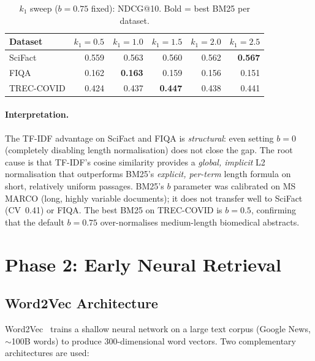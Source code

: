 \documentclass[12pt, a4paper]{article}
\makeatletter
\newcommand{\ndcg}{NDCG@10}
\newcommand{\tc}{TREC-COVID}
\newcommand{\fiqa}{FIQA}
\newcommand{\scifact}{SciFact}
\makeatother
\begin{document}
\begin{table}[h]
\centering
\caption{$k_1$ sweep ($b=0.75$ fixed): \ndcg{}.  Bold = best BM25 per dataset.}
\label{tab:bm25_k1_sweep}
\begin{tabular}{lrrrrr}
\toprule
\textbf{Dataset} & $k_1=0.5$ & $k_1=1.0$ & $k_1=1.5$ & $k_1=2.0$ & $k_1=2.5$ \\
\midrule
\scifact{}  & 0.559 & 0.563 & 0.560 & 0.562 & \textbf{0.567} \\
\fiqa{}     & 0.162 & \textbf{0.163} & 0.159 & 0.156 & 0.151 \\
\tc{}       & 0.424 & 0.437 & \textbf{0.447} & 0.438 & 0.441 \\
\bottomrule
\end{tabular}
\end{table}

\paragraph{Interpretation.}
The TF-IDF advantage on \scifact{} and \fiqa{} is \emph{structural}: even
setting $b = 0$ (completely disabling length normalisation) does not close
the gap.  The root cause is that TF-IDF's cosine similarity provides a
\emph{global, implicit} L2 normalisation that outperforms BM25's
\emph{explicit, per-term} length formula on short, relatively uniform
passages.  BM25's $b$ parameter was calibrated on MS MARCO (long, highly
variable documents); it does not transfer well to \scifact{} (CV~0.41)
or \fiqa{}.  The best BM25 on \tc{} is $b=0.5$, confirming that the
default $b=0.75$ over-normalises medium-length biomedical abstracts.

\section{Phase 2: Early Neural Retrieval}
\label{sec:early_neural}

\subsection{Word2Vec Architecture}

Word2Vec~\citep{mikolov2013distributed} trains a shallow neural network
on a large text corpus (Google News, $\sim$100B words) to produce
300-dimensional word vectors.  Two complementary architectures are used:
\end{document}
